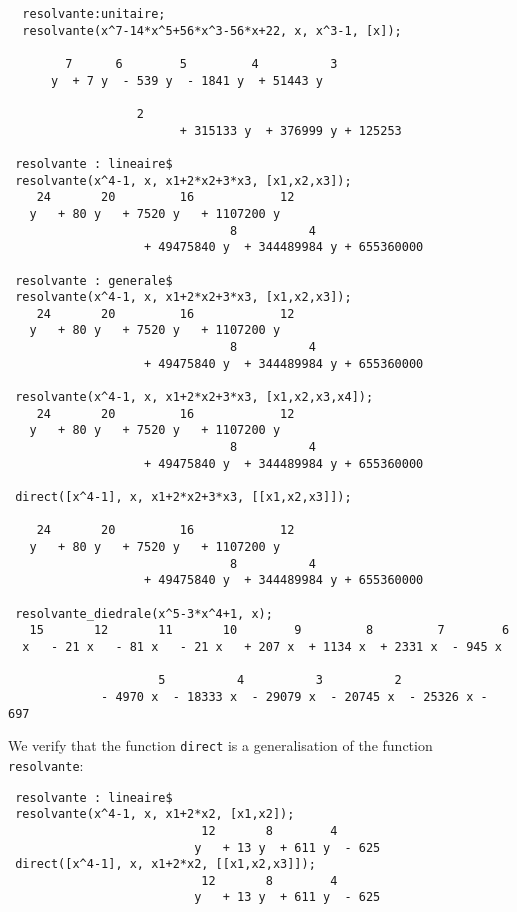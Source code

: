\documentclass[11pt]{article}
\begin{document}
\begin{verbatim}
  resolvante:unitaire;
  resolvante(x^7-14*x^5+56*x^3-56*x+22, x, x^3-1, [x]);

        7      6        5         4          3   
      y  + 7 y  - 539 y  - 1841 y  + 51443 y  

				  2
                        + 315133 y  + 376999 y + 125253  

 resolvante : lineaire$
 resolvante(x^4-1, x, x1+2*x2+3*x3, [x1,x2,x3]);
    24       20         16            12       
   y   + 80 y   + 7520 y   + 1107200 y   
                               8	      4
                   + 49475840 y  + 344489984 y + 655360000
                                                      
 resolvante : generale$
 resolvante(x^4-1, x, x1+2*x2+3*x3, [x1,x2,x3]);
    24       20         16            12       
   y   + 80 y   + 7520 y   + 1107200 y   
                               8	      4
                   + 49475840 y  + 344489984 y + 655360000

 resolvante(x^4-1, x, x1+2*x2+3*x3, [x1,x2,x3,x4]);
    24       20         16            12       
   y   + 80 y   + 7520 y   + 1107200 y   
                               8	      4
                   + 49475840 y  + 344489984 y + 655360000

 direct([x^4-1], x, x1+2*x2+3*x3, [[x1,x2,x3]]);

    24       20         16            12       
   y   + 80 y   + 7520 y   + 1107200 y   
                               8	      4
                   + 49475840 y  + 344489984 y + 655360000

 resolvante_diedrale(x^5-3*x^4+1, x);
   15       12       11       10        9         8         7        6
  x   - 21 x   - 81 x   - 21 x   + 207 x  + 1134 x  + 2331 x  - 945 x

                     5          4          3          2
             - 4970 x  - 18333 x  - 29079 x  - 20745 x  - 25326 x - 697
\end{verbatim}
\normalsize
We verify that the function \texttt{direct} is a generalisation of the function
\texttt{resolvante}:
\small
\begin{verbatim} 
 resolvante : lineaire$
 resolvante(x^4-1, x, x1+2*x2, [x1,x2]);
                           12       8        4
                          y   + 13 y  + 611 y  - 625
 direct([x^4-1], x, x1+2*x2, [[x1,x2,x3]]);
                           12       8        4
                          y   + 13 y  + 611 y  - 625
\end{verbatim}
\end{document}
